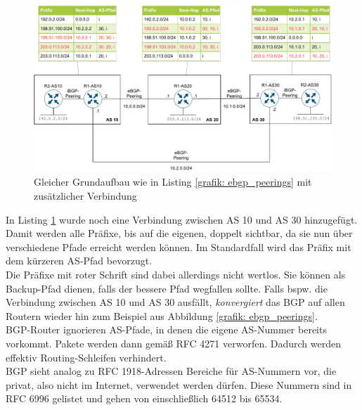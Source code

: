\begin{figure}[h]
  \centering
  \includegraphics[scale=0.75]{Figures/ebgp_peerings_additional_connection.pdf}
  \caption{Gleicher Grundaufbau wie in Listing \ref{grafik: ebgp_peerings} mit zusätzlicher Verbindung}
  \label{grafik: ebgp_peerings_additional_connection}
\end{figure}\FloatBarrier

In Listing \ref{grafik: ebgp_peerings_additional_connection} wurde noch eine Verbindung zwischen \gls{AS} 10 und \gls{AS} 30 hinzugefügt. Damit werden alle Präfixe, bis auf die eigenen, doppelt sichtbar, da sie nun über verschiedene Pfade erreicht werden können. Im Standardfall wird das Präfix mit dem kürzeren \gls{AS}-Pfad bevorzugt.\\
Die Präfixe mit roter Schrift sind dabei allerdings nicht wertlos. Sie können als Backup-Pfad dienen, falls der bessere Pfad wegfallen sollte. Falls bspw. die Verbindung zwischen \gls{AS} 10 und \gls{AS} 30 ausfällt, \textit{konvergiert} das \gls{BGP} auf allen Routern wieder hin zum Beispiel aus Abbildung \ref{grafik: ebgp_peerings}.\\
BGP-Router ignorieren \gls{AS}-Pfade, in denen die eigene \gls{AS}-Nummer bereits vorkommt. Pakete werden dann gemäß \gls{RFC} 4271 verworfen. Dadurch werden effektiv Routing-Schleifen verhindert\cite{rfc4271}.\\
BGP sieht analog zu \gls{RFC} 1918-Adressen Bereiche für \gls{AS}-Nummern vor, die privat, also nicht im Internet, verwendet werden dürfen. Diese Nummern sind in \gls{RFC} 6996 gelistet und gehen von einschließlich 64512 bis 65534\cite{rfc6996}.

